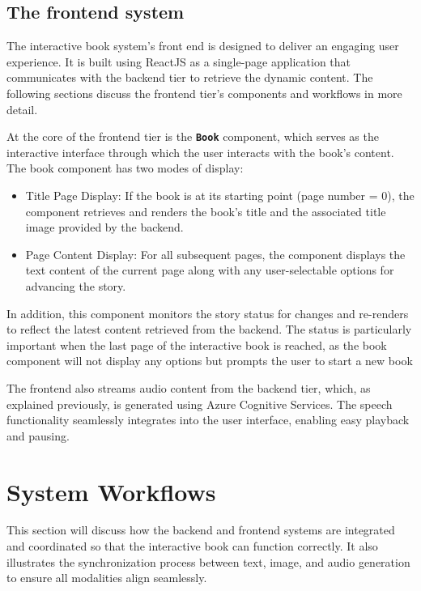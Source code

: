 \documentclass[conference]{IEEEtran}
\begin{document}
	\subsection{The frontend system}
	
	The interactive book system's front end is designed to deliver an engaging user experience. It is built using ReactJS as a single-page application that communicates with the backend tier to retrieve the dynamic content. The following sections discuss the frontend tier's components and workflows in more detail.
	
	At the core of the frontend tier is the \textbf{\texttt{Book}} component, which serves as the interactive interface through which the user interacts with the book's content. The book component has two modes of display:
	
	\begin{itemize}
		\item Title Page Display: If the book is at its starting point (page number = 0), the component retrieves and renders the book's title and the associated title image provided by the backend.
		\item Page Content Display: For all subsequent pages, the component displays the text content of the current page along with any user-selectable options for advancing the story.
	\end{itemize}
	
	In addition, this component monitors the story status for changes and re-renders to reflect the latest content retrieved from the backend. The status is particularly important when the last page of the interactive book is reached, as the book component will not display any options but prompts the user to start a new book
	
	The frontend also streams audio content from the backend tier, which, as explained previously, is generated using Azure Cognitive Services. The speech functionality seamlessly integrates into the user interface, enabling easy playback and pausing.
	
	
	\section{System Workflows}
	
	This section will discuss how the backend and frontend systems are integrated and coordinated so that the interactive book can function correctly. It also illustrates the synchronization process between text, image, and audio generation to ensure all modalities align seamlessly.
	
\end{document}
